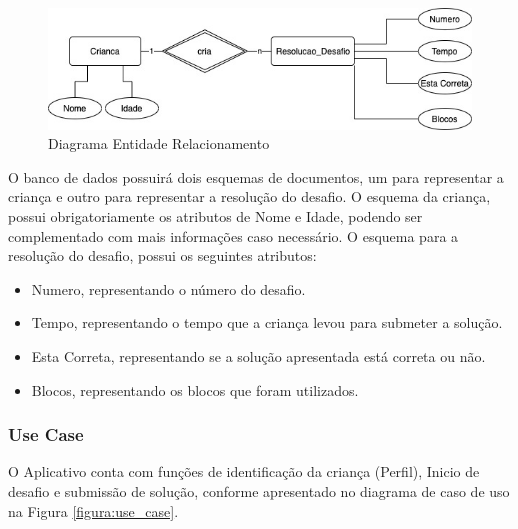         \begin{figure}[H]
            \caption{Diagrama Entidade Relacionamento}
            \begin{center}
                \includegraphics[width=\linewidth]{Imagens/cap3/MER_DER.jpg}
            \end{center}
            \label{figura:der_mer}
        \end{figure}
        
        O banco de dados possuirá dois esquemas de documentos, um para representar a criança e outro para representar a resolução do desafio.
        O esquema da criança, possui obrigatoriamente os atributos de Nome e Idade, podendo ser complementado com mais informações caso necessário.
        O esquema para a resolução do desafio, possui os seguintes atributos:
        
        \begin{itemize}
            \item Numero, representando o número do desafio.
            \item Tempo, representando o tempo que a criança levou para submeter a solução.
            \item Esta Correta, representando se a solução apresentada está correta ou não.
            \item Blocos, representando os blocos que foram utilizados.
        \end{itemize} 
        
        \subsubsection{Use Case}
        O Aplicativo conta com funções de identificação da criança (Perfil), Inicio de desafio e submissão de solução, conforme apresentado no diagrama de caso de uso na Figura \ref{figura:use_case}.
        
